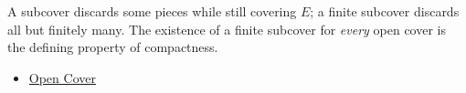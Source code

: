 \begin{remark*}[Interpretation]
A subcover discards some pieces while still covering $E$; a finite subcover discards all but finitely many. The existence of a finite subcover for \emph{every} open cover is the defining property of compactness.
\end{remark*}
\begin{dependencies}
\begin{itemize}
  \item \hyperref[def:open-cover]{Open Cover}
\end{itemize}
\end{dependencies}
